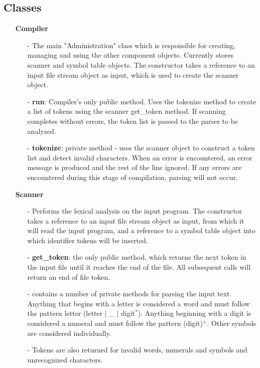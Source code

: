 \documentclass{article}
\begin{document}
\subsection*{Classes}

    \begin{itemize}
        \item[]\textbf{Compiler}
            \begin{itemize}
                \item[-] The main "Administration" class which is responsible for creating, managing and using the other component objects. Currently stores scanner and symbol table objects. The constructor takes a reference to an input file stream object as input, which is used to create the scanner object. 
                \item[-] \textbf{run}: Compiler's only public method. Uses the tokenize method to create a list of tokens using the scanner get\_token method. If scanning completes without errors, the token list is passed to the parser to be analyzed.
                \item[-] \textbf{tokenize}: private method - uses the scanner object to construct a token list and detect invalid characters. When an error is encountered, an error message is produced and the rest of the line ignored. If any errors are encountered during this stage of compilation, parsing will not occur.
            \end{itemize}

        \item[]\textbf{Scanner}
            \begin{itemize}
                \item[-] Performs the lexical analysis on the input program. The constructor takes a reference to an input file stream object as input, from which it will read the input program, and a reference to a symbol table object into which identifier tokens will be inserted. 
                \item[-] \textbf{get\_token}: the only public method, which returns the next token in the input file until it reaches the end of the file. All subsequent calls will return an end of file token.
                \item[-] contains a number of private methods for parsing the input text. Anything that begins with a letter is considered a word and must follow the pattern letter (letter | \_ | digit$^*$). Anything beginning with a digit is considered a numeral and must follow the pattern (digit)$^+$. Other symbols are considered individually. 
                \item[-]Tokens are also returned for invalid words, numerals and symbols and unrecognized characters. 
            \end{itemize}


\end{itemize}
\end{document}
